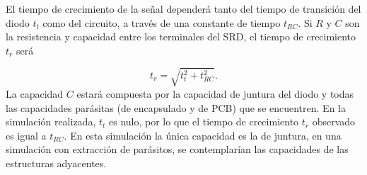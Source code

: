 El tiempo de crecimiento de la señal dependerá tanto del tiempo de transición
del diodo $t_t$ como del circuito, a través de una constante de tiempo $t_{RC}$.
Si $R$ y $C$ son la resistencia y capacidad entre los terminales del SRD, el
tiempo de crecimiento $t_r$ será \cite{an918}

\begin{equation}
    t_r = \sqrt{t_t^2+t_{RC}^2}.
\end{equation}
La capacidad $C$ estará compuesta por la capacidad de juntura del diodo y todas
las capacidades parásitas (de encapsulado y de PCB) que se encuentren. En la
simulación realizada, $t_t$ es nulo, por lo que el tiempo de crecimiento $t_r$
observado es igual a $t_{RC}$. En esta simulación la única capacidad es la de
juntura, en una simulación con extracción de parásitos, se contemplarían las
capacidades de las estructuras adyacentes.
